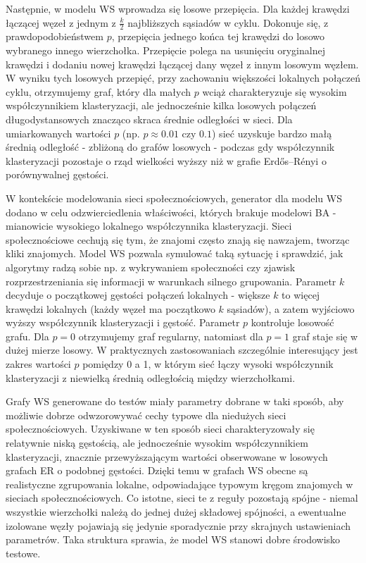 Następnie, w modelu WS wprowadza się losowe przepięcia. Dla każdej krawędzi łączącej węzeł z jednym z $\frac{k}{2}$ najbliższych sąsiadów w cyklu. Dokonuje się, z prawdopodobieństwem $p$, przepięcia jednego końca tej krawędzi do losowo wybranego innego wierzchołka. Przepięcie polega na usunięciu oryginalnej krawędzi i dodaniu nowej krawędzi łączącej dany węzeł z innym losowym węzłem. W wyniku tych losowych przepięć, przy zachowaniu większości lokalnych połączeń cyklu, otrzymujemy graf, który dla małych $p$ wciąż charakteryzuje się wysokim współczynnikiem klasteryzacji, ale jednocześnie kilka losowych połączeń długodystansowych znacząco skraca średnie odległości w sieci. 
Dla umiarkowanych wartości $p$ (np. $p \approx 0.01$ czy $0.1$) sieć uzyskuje bardzo małą średnią odległość - zbliżoną do grafów losowych - podczas gdy współczynnik klasteryzacji pozostaje o rząd wielkości wyższy niż w grafie Erdős--Rényi o porównywalnej gęstości.

W kontekście modelowania sieci społecznościowych, generator dla modelu WS dodano w celu odzwierciedlenia właściwości, których brakuje modelowi BA - mianowicie wysokiego lokalnego współczynnika klasteryzacji. Sieci społecznościowe cechują się tym, że znajomi często znają się nawzajem, tworząc kliki znajomych. Model WS pozwala symulować taką sytuację i sprawdzić, jak algorytmy radzą sobie np. z wykrywaniem społeczności czy zjawisk rozprzestrzeniania się informacji w warunkach silnego grupowania. Parametr $k$ decyduje o początkowej gęstości połączeń lokalnych - większe $k$ to więcej krawędzi lokalnych (każdy węzeł ma początkowo $k$ sąsiadów), a zatem wyjściowo wyższy współczynnik klasteryzacji i gęstość. Parametr $p$ kontroluje losowość grafu. 
Dla $p=0$ otrzymujemy graf regularny, natomiast dla $p=1$ graf staje się w dużej mierze losowy. 
W praktycznych zastosowaniach szczególnie interesujący jest zakres wartości $p$ pomiędzy 0 a 1, w którym sieć łączy wysoki współczynnik klasteryzacji z niewielką średnią odległością między wierzchołkami.


Grafy WS generowane do testów miały parametry dobrane w taki sposób, aby możliwie dobrze odwzorowywać cechy typowe dla niedużych sieci społecznościowych. Uzyskiwane w ten sposób sieci charakteryzowały się relatywnie niską gęstością, ale jednocześnie wysokim współczynnikiem klasteryzacji, znacznie przewyższającym wartości obserwowane w losowych grafach ER o podobnej gęstości. Dzięki temu w grafach WS obecne są realistyczne zgrupowania lokalne, odpowiadające typowym kręgom znajomych w sieciach społecznościowych. Co istotne, sieci te z reguły pozostają spójne - niemal wszystkie wierzchołki należą do jednej dużej składowej spójności, a ewentualne izolowane węzły pojawiają się jedynie sporadycznie przy skrajnych ustawieniach parametrów. Taka struktura sprawia, że model WS stanowi dobre środowisko testowe.

